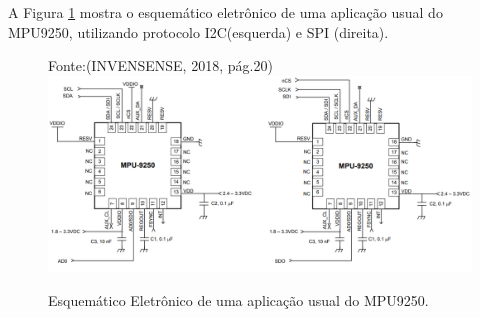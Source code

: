 \begin{table}[h]
	\centering
	\caption{Informações técnicas sobre sensor MPU9250.}
	\label{tab_ive}
\end{table}

A Figura \ref{mpu} mostra o esquemático eletrônico de uma aplicação usual do MPU9250, utilizando protocolo I2C(esquerda) e SPI (direita).

\begin{figure}[h]
	\centering
	Fonte:(INVENSENSE, 2018, pág.20)\linebreak
	\includegraphics[keepaspectratio=true,scale=0.4]{figuras/mpu9250.PNG}
	\caption{Esquemático Eletrônico de uma aplicação usual do MPU9250.}	
	\label{mpu}
\end{figure}
\FloatBarrier
